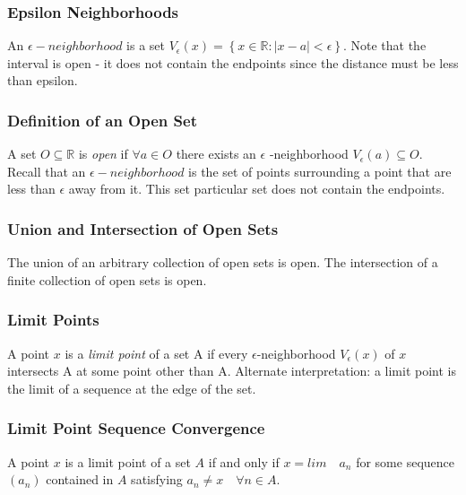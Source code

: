 \documentclass{article}
\begin{document}
\subsubsection{Epsilon Neighborhoods}

An $ \epsilon -neighborhood $ is a set \( V_{\epsilon} (x) = \left \{ x \in \mathbb{R} : | x- a | < \epsilon \right \} \). Note that the interval is open - it does not contain the endpoints since the distance must be less than epsilon.

\subsubsection{Definition of an Open Set}

A set \( O \subseteq \mathbb{R} \) is \textit{open} if \( \forall a \in O \) there exists an $ \epsilon $ -neighborhood \( V_{\epsilon} (a) \subseteq O \). Recall that an $\epsilon - neighborhood$ is the set of points surrounding a point that are less than $ \epsilon $ away from it. This set particular set does not contain the endpoints. 

\subsubsection{Union and Intersection of Open Sets}

The union of an arbitrary collection of open sets is open. The intersection of a finite collection of open sets is open. 

\subsubsection{Limit Points}

A point $x$ is a \textit{limit point} of a set A if every $ \epsilon$-neighborhood  $V_{\epsilon}(x)$ of $x$ intersects A at some point other than A.  Alternate interpretation: a limit point is the limit of a sequence at the edge of the set.

\subsubsection{Limit Point Sequence Convergence}

A point $x$ is a limit point of a set $A$ if and only if $x=lim \quad a_n $ for some sequence $ (a_n) $ contained in $A$ satisfying \(a_n \neq x \quad \forall n \in A \).
\end{document}
